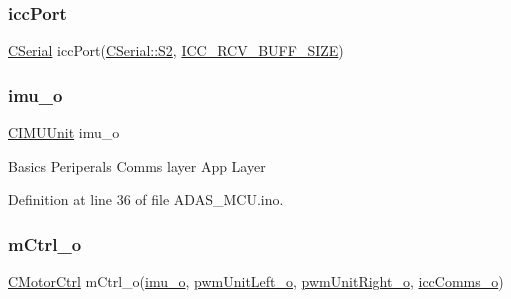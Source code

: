 \mbox{\label{_a_d_a_s___m_c_u_8ino_ad1e6d9fed4369104e412a46c019634d2}} 
\subsubsection{\texorpdfstring{iccPort}{iccPort}}
{\footnotesize\ttfamily \mbox{\hyperlink{class_c_serial}{C\+Serial}} icc\+Port(\mbox{\hyperlink{class_c_serial_a000039540cc90b18bafacf5744e7eda2a8cc95f4591147b0df028e003f82220a1}{C\+Serial\+::\+S2}}, \mbox{\hyperlink{_a_d_a_s___cfg_8h_abf41bed56ee0b2a8858687c4420bb110}{I\+C\+C\+\_\+\+R\+C\+V\+\_\+\+B\+U\+F\+F\+\_\+\+S\+I\+ZE}})}

\mbox{\label{_a_d_a_s___m_c_u_8ino_ae51e36f83228f859afeb8a72e60339a6}} 
\subsubsection{\texorpdfstring{imu\_o}{imu\_o}}
{\footnotesize\ttfamily \mbox{\hyperlink{class_c_i_m_u_unit}{C\+I\+M\+U\+Unit}} imu\+\_\+o}

Basics Periperals Comms layer App Layer 

Definition at line 36 of file A\+D\+A\+S\+\_\+\+M\+C\+U.\+ino.

\mbox{\label{_a_d_a_s___m_c_u_8ino_ab618fa643b3224c905b4fcbd074fb481}} 
\subsubsection{\texorpdfstring{mCtrl\_o}{mCtrl\_o}}
{\footnotesize\ttfamily \mbox{\hyperlink{class_c_motor_ctrl}{C\+Motor\+Ctrl}} m\+Ctrl\+\_\+o(\mbox{\hyperlink{_a_d_a_s___m_c_u_8ino_ae51e36f83228f859afeb8a72e60339a6}{imu\+\_\+o}}, \mbox{\hyperlink{_a_d_a_s___m_c_u_8ino_a10a570a59ef56c08699c4fec61d47d16}{pwm\+Unit\+Left\+\_\+o}}, \mbox{\hyperlink{_a_d_a_s___m_c_u_8ino_a49af1ef8724d9cb785e37641bb0cdc6b}{pwm\+Unit\+Right\+\_\+o}}, \mbox{\hyperlink{_a_d_a_s___m_c_u_8ino_a62ef6b3308259edb69af585549178324}{icc\+Comms\+\_\+o}})}

\mbox{\label{_a_d_a_s___m_c_u_8ino_a10a570a59ef56c08699c4fec61d47d16}} 
